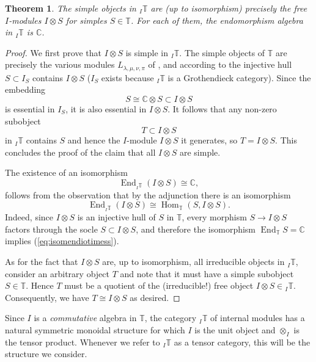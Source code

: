 \documentclass[11pt]{article}
\theoremstyle{plain}
\newtheorem{theorem}[lemma]{Theorem}
\theoremstyle{nonumberplain}
\theoremstyle{plain}
\numberwithin{equation}{section}
\theoremstyle{nonumberplain}
\newtheorem{proof}{Proof}
\newcommand\bC{{\mathbb C}}
\newcommand\bT{{\mathbb T}}
\newcommand\1{{\bf 1}}
\DeclareMathOperator{\End}{\mathrm{End}}
\DeclareMathOperator{\Hom}{\mathrm{Hom}}
\begin{document}
\begin{theorem}\label{th:itsimp}
  The simple objects in ${}_I\bT$ are (up to isomorphism) precisely the free $I$-modules $I\otimes S$ for simples $S\in \bT$. For each of them, the endomorphism algebra in ${}_I\bT$ is $\bC$. 
\end{theorem}
\begin{proof}
  We first prove that $I\otimes S$ is simple in ${}_I\bT$. The simple objects of $\bT$ are precisely the various modules $L_{\lambda,\mu,\nu,\pi}$ of , and according to  the injective hull $S\subset I_S$ contains $I\otimes S$ ($I_S$ exists because ${}_I \bT$ is a Grothendieck category). Since the embedding
  \begin{equation*}
    S\cong \bC\otimes S\subset I\otimes S
  \end{equation*}
  is essential in $I_S$, it is also essential in $I\otimes S$. It follows that any non-zero subobject
  \begin{equation*}
    T\subset I\otimes S
  \end{equation*}
  in ${}_I\bT$ contains $S$ and hence the $I$-module $I\otimes S$ it generates, so $T=I\otimes S$. This concludes the proof of the claim that all $I\otimes S$ are simple.

  The existence of an isomorphism
  \begin{equation}\label{eq:isomendiotimess}
    \End_{{}_I\bT}(I\otimes S)\cong \bC,
  \end{equation}
  follows from the observation that by the adjunction  there is an isomorphism
  \begin{equation*}
    \End_{{}_I\bT}(I\otimes S) \cong \Hom_{\bT}(S, I\otimes S). 
  \end{equation*}
  \noindent Indeed, since $I\otimes S$ is an injective hull of $S$ in $\bT$, every morphism $S\rightarrow I\otimes S$ factors through the socle $S\subset I\otimes S$, and therefore the isomorphism $\End_{\bT} S=\bC$ implies (\ref{eq:isomendiotimess}).

As for the fact that $I\otimes S$ are, up to isomorphism, all irreducible  objects in ${}_I\bT$, consider an arbitrary object $T$ and note that it must have a simple subobject $S\in \bT$. Hence $T$ must be a quotient of the (irreducible!) free object $I\otimes S\in {}_I\bT$. Consequently, we have $T\cong I\otimes S$ as desired.
\end{proof}

Since $I$ is a {\it commutative} algebra in $\bT$, the category ${}_I\bT$ of internal modules has a natural symmetric monoidal structure for which $I$ is the unit object and $\otimes_I$ is the tensor product. Whenever we refer to ${}_I\bT$ as a tensor category, this will be the structure we consider. %
\end{document}
